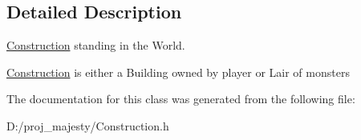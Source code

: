 \subsection{Detailed Description}
\hyperlink{class_construction}{Construction} standing in the World. 

\hyperlink{class_construction}{Construction} is either a Building owned by player or Lair of monsters 

The documentation for this class was generated from the following file\+:\begin{DoxyCompactItemize}
\item 
D\+:/proj\+\_\+majesty/Construction.\+h\end{DoxyCompactItemize}
